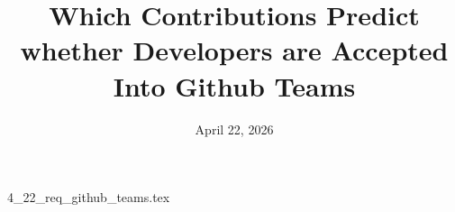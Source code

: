 \documentclass{article}      %
\title{Which Contributions Predict whether Developers are Accepted Into Github Teams}  %
\date{April 22, 2026}
\begin{document}

\maketitle                   %



{4_22_req_github_teams.tex}
\printbibliography
\end{document}
